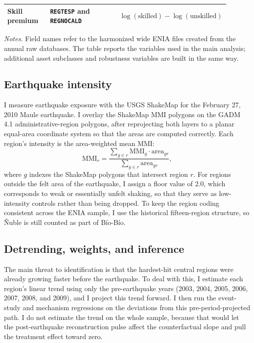 \documentclass[12pt]{article}
\begin{document}
\begin{table}[htbp]
\begin{threeparttable}
\begin{tabular}{p{0.21\linewidth}p{0.42\linewidth}p{0.27\linewidth}}
Skill premium & \texttt{REGTESP} and \texttt{REGNOCALD} & $\log(\text{skilled})-\log(\text{unskilled})$ \\
\bottomrule
\end{tabular}
\begin{tablenotes}[flushleft]\footnotesize
\item \textit{Notes.} Field names refer to the harmonized wide ENIA files created from the annual raw
databases. The table reports the variables used in the main analysis; additional asset subclasses and
robustness variables are built in the same way.
\end{tablenotes}
\end{threeparttable}
\end{table}

\subsection{Earthquake intensity}
I measure earthquake exposure with the USGS ShakeMap for the February 27, 2010 Maule earthquake. I overlay
the ShakeMap MMI polygons on the GADM 4.1 administrative-region polygons, after reprojecting both layers to
a planar equal-area coordinate system so that the areas are computed correctly. Each region's intensity is
the area-weighted mean MMI:
\[ \text{MMI}_r = \frac{\sum_{g \in r} \text{MMI}_g \cdot \text{area}_{gr}}{\sum_{g \in r} \text{area}_{gr}}, \]
where $g$ indexes the ShakeMap polygons that intersect region $r$. For regions outside the felt area of the
earthquake, I assign a floor value of 2.0, which corresponds to weak or essentially unfelt shaking, so that
they serve as low-intensity controls rather than being dropped. To keep the region coding consistent across
the ENIA sample, I use the historical fifteen-region structure, so \~Nuble is still counted as part of
B\'io-B\'io.

\subsection{Detrending, weights, and inference}
The main threat to identification is that the hardest-hit central regions were already growing faster before
the earthquake. To deal with this, I estimate each region's linear trend using only the pre-earthquake years
(2003, 2004, 2005, 2006, 2007, 2008, and 2009), and I project this trend forward. I then run the event-study
and mechanism regressions on the deviations from this pre-period-projected path. I do not estimate the trend
on the whole sample, because that would let the post-earthquake reconstruction pulse affect the counterfactual
slope and pull the treatment effect toward zero.
\end{document}
